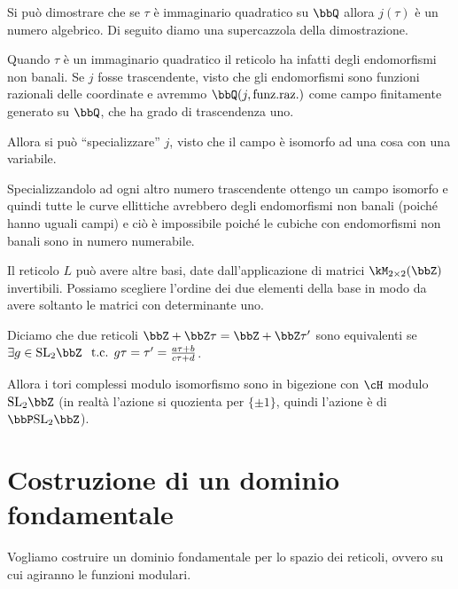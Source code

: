 \begin{divagazione}
  Si può dimostrare che se $\tau$ è immaginario quadratico su $\bbQ$ allora
  $j(\tau)$ è un numero algebrico. Di seguito diamo una supercazzola della dimostrazione.

  Quando $\tau$ è un immaginario quadratico il reticolo ha infatti degli
  endomorfismi non banali. Se $j$ fosse trascendente, visto che gli
  endomorfismi sono funzioni razionali delle coordinate e avremmo
  $\bbQ(j, \text{funz.raz.})$ come campo finitamente generato su $\bbQ$,
  che ha grado di trascendenza uno.

  Allora si può ``specializzare'' $j$, visto che il campo è isomorfo ad
  una cosa con una variabile.

  
  Specializzandolo ad ogni altro numero trascendente ottengo un campo
  isomorfo e quindi tutte le curve ellittiche avrebbero degli
  endomorfismi non banali (poiché hanno uguali campi) e ciò è
  impossibile poiché le cubiche con endomorfismi non banali sono in numero
  numerabile.
\end{divagazione}

Il reticolo $L$ può avere altre basi, date dall'applicazione di matrici
$\kM_{2 \times 2} (\bbZ)$ invertibili. Possiamo scegliere l'ordine dei
due elementi della base in modo da avere soltanto le matrici con
determinante uno.

Diciamo che due reticoli $\bbZ + \bbZ \tau = \bbZ + \bbZ \tau'$ sono
equivalenti se $\exists g \in \SL_2 \bbZ$
$\text{ t.c. } g\tau = \tau' = \frac{a \tau + b}{c \tau + d}$.

Allora i tori complessi modulo isomorfismo sono in bigezione con $\cH$
modulo $\SL_2 \bbZ$ (in realtà l'azione si quozienta per $\{\pm 1\}$,
quindi l'azione è di $\bbP\SL_2 \bbZ$).

\section{Costruzione di un dominio fondamentale}

Vogliamo costruire un dominio fondamentale per lo spazio dei reticoli,
ovvero su cui agiranno le funzioni modulari.

